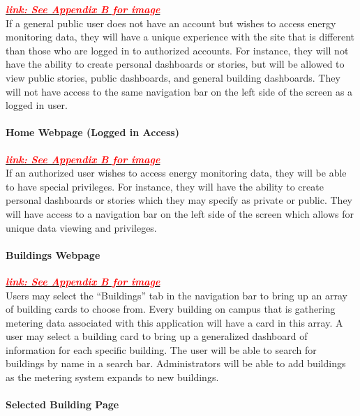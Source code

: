 \textbf{\textit{\hyperref[sec:home_public]{\textcolor{red}{link: See Appendix B for image}}}}\\ 

If a general public user does not have an account but wishes to access energy monitoring data, they will
have a unique experience with the site that is different than those who are logged in to authorized accounts. 
For instance, they will not have the ability to create personal dashboards or stories, but will be allowed to view
public stories, public dashboards, and general building dashboards. They will not have access to the same navigation 
bar on the left side of the screen as a logged in user. 

\paragraph{Home Webpage (Logged in Access)}

\textbf{\textit{\hyperref[sec:home_logged]{\textcolor{red}{link: See Appendix B for image}}}}\\

If an authorized user wishes to access energy monitoring data, they will be able to have special privileges.
For instance, they will have the ability to create personal dashboards or stories which they may specify as private or public.
They will have access to a navigation bar on the left side of the screen which allows for unique data viewing and privileges. 

\paragraph{Buildings Webpage} 

\textbf{\textit{\hyperref[sec:buildings]{\textcolor{red}{link: See Appendix B for image}}}}\\ 

Users may select the ``Buildings'' tab in the navigation bar to bring up an array of building cards to choose from.
Every building on campus that is gathering metering data associated with this application will have a card in this array.
A user may select a building card to bring up a generalized dashboard of information for each specific building. 
The user will be able to search for buildings by name in a search bar. Administrators will be able to add buildings as the metering system expands to new buildings.

\paragraph{Selected Building Page}

